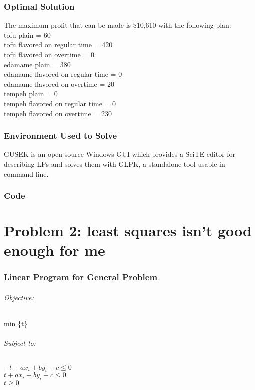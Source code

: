 \documentclass{article}
\begin{document}
\section*{Optimal Solution}
The maximum profit that can be made is \$10,610 with the following plan:\\
tofu plain = 60\\
tofu flavored on regular time = 420\\
tofu flavored on overtime = 0\\
edamame plain = 380\\
edamame flavored on regular time = 0\\
edamame flavored on overtime = 20\\
tempeh plain = 0\\
tempeh flavored on regular time = 0\\
tempeh flavored on overtime = 230\\

\section*{Environment Used to Solve}
GUSEK is an open source Windows GUI which provides a SciTE editor for describing LPs and solves them with GLPK, a standalone tool usable in command line.

\section*{Code}


\pagebreak


\part*{Problem 2: least squares isn't good enough for me}
\section*{Linear Program for General Problem}
\paragraph*{Objective:}
min \{t\}

\paragraph*{Subject to:\\}
$-t + ax_i + by_i - c \leq 0$\\
$t + ax_i + by_i - c \leq 0$\\
$t \geq 0$\\
\end{document}
